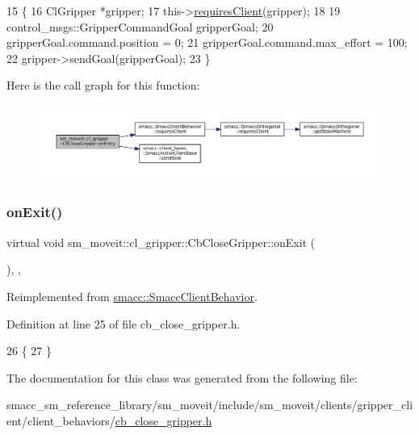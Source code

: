 \begin{DoxyCode}
15     \{
16         ClGripper *gripper;
17         this->\hyperlink{classsmacc_1_1SmaccClientBehavior_a917f001e763a1059af337bf4e164f542}{requiresClient}(gripper);
18 
19         control\_msgs::GripperCommandGoal gripperGoal;
20         gripperGoal.command.position = 0;
21         gripperGoal.command.max\_effort = 100;
22         gripper->sendGoal(gripperGoal);
23     \}
\end{DoxyCode}
Here is the call graph for this function\+:
\nopagebreak
\begin{figure}[H]
\begin{center}
\leavevmode
\includegraphics[width=350pt]{classsm__moveit_1_1cl__gripper_1_1CbCloseGripper_adc772dda477c6370dc41117613e35699_cgraph}
\end{center}
\end{figure}
\mbox{\label{classsm__moveit_1_1cl__gripper_1_1CbCloseGripper_a643cca41b7a62a3c2b26e07ab7edb05a}} 
\subsubsection{\texorpdfstring{on\+Exit()}{onExit()}}
{\footnotesize\ttfamily virtual void sm\+\_\+moveit\+::cl\+\_\+gripper\+::\+Cb\+Close\+Gripper\+::on\+Exit (\begin{DoxyParamCaption}{ }\end{DoxyParamCaption})\hspace{0.3cm}{\ttfamily [inline]}, {\ttfamily [override]}, {\ttfamily [virtual]}}



Reimplemented from \hyperlink{classsmacc_1_1SmaccClientBehavior_ac0cd72d42bd00425362a97c9803ecce5}{smacc\+::\+Smacc\+Client\+Behavior}.



Definition at line 25 of file cb\+\_\+close\+\_\+gripper.\+h.


\begin{DoxyCode}
26     \{
27     \}
\end{DoxyCode}


The documentation for this class was generated from the following file\+:\begin{DoxyCompactItemize}
\item 
smacc\+\_\+sm\+\_\+reference\+\_\+library/sm\+\_\+moveit/include/sm\+\_\+moveit/clients/gripper\+\_\+client/client\+\_\+behaviors/\hyperlink{cb__close__gripper_8h}{cb\+\_\+close\+\_\+gripper.\+h}\end{DoxyCompactItemize}
